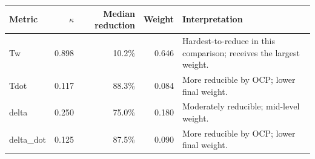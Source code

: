 \begin{tabular}{l r r r l}
\hline
Metric & $\kappa$ & Median reduction & Weight & Interpretation \\
\hline
Tw & 0.898 & 10.2\% & 0.646 & Hardest-to-reduce in this comparison; receives the largest weight. \\
Tdot & 0.117 & 88.3\% & 0.084 & More reducible by OCP; lower final weight. \\
delta & 0.250 & 75.0\% & 0.180 & Moderately reducible; mid-level weight. \\
delta\_dot & 0.125 & 87.5\% & 0.090 & More reducible by OCP; lower final weight. \\
\hline
\end{tabular}

